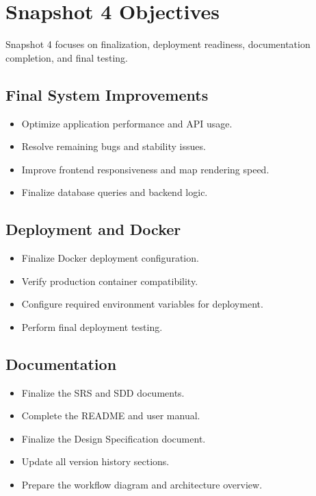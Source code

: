 \documentclass[12pt]{article}
\begin{document}
\newpage

\section{Snapshot 4 Objectives}

Snapshot 4 focuses on finalization, deployment readiness, documentation completion, and final testing.

\subsection{Final System Improvements}
\begin{itemize}
\item Optimize application performance and API usage.
\item Resolve remaining bugs and stability issues.
\item Improve frontend responsiveness and map rendering speed.
\item Finalize database queries and backend logic.
\end{itemize}

\subsection{Deployment and Docker}
\begin{itemize}
\item Finalize Docker deployment configuration.
\item Verify production container compatibility.
\item Configure required environment variables for deployment.
\item Perform final deployment testing.
\end{itemize}

\subsection{Documentation}
\begin{itemize}
\item Finalize the SRS and SDD documents.
\item Complete the README and user manual.
\item Finalize the Design Specification document.
\item Update all version history sections.
\item Prepare the workflow diagram and architecture overview.
\end{itemize}
\end{document}
